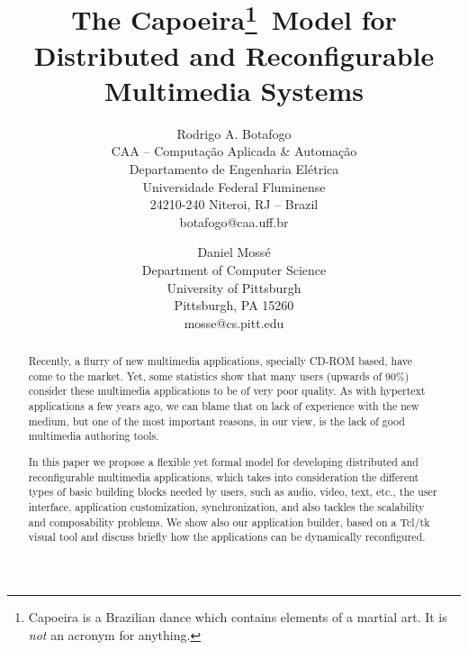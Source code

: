 \documentclass[twocolumn,10pt]{article}
\begin{document}

\title{\bf The Capoeira\thanks{Capoeira is a Brazilian dance which
    contains elements of a martial art.  It is {\em not} an acronym for
    anything.}\ Model for\\Distributed and Reconfigurable
    Multimedia Systems}

\author{Rodrigo A. Botafogo \\ CAA -- Computa\c{c}\~ao Aplicada \&
  Automa\c{c}\~ao\\ Departamento de Engenharia El\'etrica\\ 
  Universidade Federal Fluminense\\ 24210-240 Niteroi, RJ -- Brazil\\ 
  botafogo@caa.uff.br \and Daniel
  Moss\'e \\ Department of Computer Science \\ University of
  Pittsburgh \\ Pittsburgh, PA 15260\\ mosse@cs.pitt.edu}

\date{}

\maketitle \thispagestyle{empty}

\begin{abstract} 

Recently, a flurry of new multimedia applications, specially CD-ROM
based, have come to the market.  Yet, some statistics show that many
users (upwards of 90\%) consider these multimedia applications to be of
very poor quality.  As with hypertext applications a few years ago, we
can blame that on lack of experience with the new medium, but one of
the most important reasons, in our view, is the lack of good
multimedia authoring tools.

In this paper we propose a flexible yet formal model for developing
distributed and reconfigurable multimedia applications, which takes
into consideration the different types of basic building blocks needed
by users, such as audio, video, text, etc., the user interface,
application customization, synchronization, and also tackles the
scalability and composability problems. We show also our application
builder, based on a Tcl/tk visual tool and discuss briefly how the
applications can be dynamically reconfigured.\\

\end{abstract}
\end{document}
